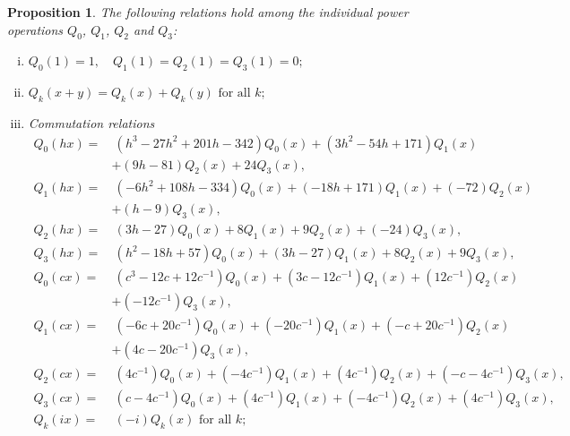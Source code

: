 \documentclass[microtype]{gtpart}     %
\newtheorem{prop}{Proposition}[section]
\theoremstyle{remark}
\theoremstyle{definition}
\begin{document}
\begin{prop}
\label{prop:Q}
 The following relations hold among the individual power operations $Q_0$, 
 $Q_1$, $Q_2$ and $Q_3$: 
 \begin{enumerate}[(i)]
  \item \label{Q(i)} $Q_0(1) = 1, \quad Q_1(1) = Q_2(1) = Q_3(1) = 0;$ 

  \item \label{Q(ii)} $Q_k(x+y) = Q_k(x) + Q_k(y) \text{~for all~} k;$ 

  \item \label{Q(iii)} {\em Commutation relations }
  \begin{equation*}
  \begin{split}
   Q_0(h x) = & ~ (h^3 - 27 h^2 + 201 h - 342) Q_0(x) + (3 h^2 - 54 h + 171) Q_1(x) \\
              & + (9 h - 81) Q_2(x) + 24 Q_3(x), \\
   Q_1(h x) = & ~ (-6 h^2 + 108 h - 334) Q_0(x) + (-18 h + 171) Q_1(x) + (-72) Q_2(x) \\
              & + (h - 9) Q_3(x), \\
   Q_2(h x) = & ~ (3 h - 27) Q_0(x) + 8 Q_1(x) + 9 Q_2(x) + (-24) Q_3(x), \\
   Q_3(h x) = & ~ (h^2 - 18 h + 57) Q_0(x) + (3 h - 27) Q_1(x) + 8 Q_2(x) + 9 Q_3(x), \\
   Q_0(c x) = & ~ (c^3 - 12 c + 12 c^{-1}) Q_0(x) + (3 c - 12 c^{-1}) Q_1(x) + (12 c^{-1}) Q_2(x) \\
              & + (-12 c^{-1}) Q_3(x), \\
   Q_1(c x) = & ~ (-6 c + 20 c^{-1}) Q_0(x) + (-20 c^{-1}) Q_1(x) + (- c + 20 c^{-1}) Q_2(x) \\
              & + (4 c - 20 c^{-1}) Q_3(x), \\
   Q_2(c x) = & ~ (4 c^{-1}) Q_0(x) + (-4 c^{-1}) Q_1(x) + (4 c^{-1}) Q_2(x) + (- c - 4 c^{-1}) Q_3(x), \qquad \\
   Q_3(c x) = & ~ (c - 4 c^{-1}) Q_0(x) + (4 c^{-1}) Q_1(x) + (-4 c^{-1}) Q_2(x) + (4 c^{-1}) Q_3(x), \\
   Q_k(i x) = & ~ (-i) Q_k(x) \text{~for all~} k; 
  \end{split}
  \end{equation*}


\end{enumerate}
\end{prop}
\end{document}
